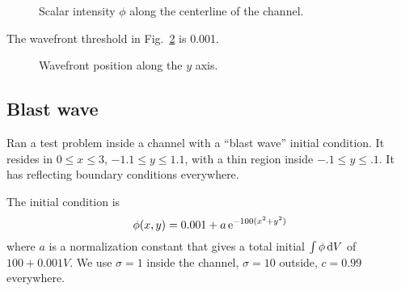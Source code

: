 \begin{figure}[htb]
  \centering\small
  \subfloat[$t=2$]{%
    }%
  \subfloat[$t=5$]{%
    }

  \subfloat[$t=10$]{%
    }%
  \subfloat[$t=15$]{%
    }

  \caption{Scalar intensity $\phi$ along the centerline of the channel.}
  \label{fig:tdReactor}
\end{figure}

The wavefront threshold in Fig.~\ref{fig:tdReactorWavefront} is 0.001.

\begin{figure}[htb]
  \centering\small
  \subfloat[Channel, $y=2.5$]{%
    }

  \subfloat[Medium, $y=0$]{%
    }

  \caption{Wavefront position along the $y$ axis.}
  \label{fig:tdReactorWavefront}
\end{figure}

\clearpage
\subsection{Blast wave}

Ran a test problem inside a channel with a ``blast wave'' initial condition. It
resides in $0 \le x \le 3$, $-1.1 \le y \le 1.1$, with a thin region inside
$-.1 \le y \le .1$. It has reflecting boundary conditions everywhere.

The initial condition is
\begin{equation*}
  \phi(x,y) = 0.001 + a \mathop{}\!\mathrm{e}^{-100 (x^2 + y^2) }
\end{equation*}
where $a$ is a normalization constant that gives a total initial $\int \phi
\mathop{}\!\mathrm{d} V$ of $100 + 0.001 V$. We use $\sigma=1$ inside the channel, $\sigma=10$
outside, $c=0.99$ everywhere.

